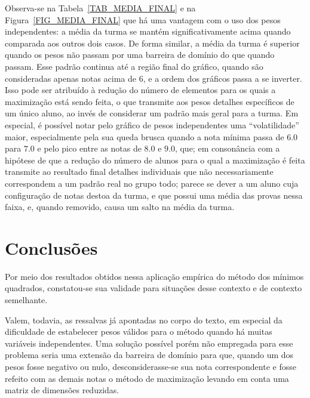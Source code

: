 \documentclass[11pt]{article}
\begin{document}
                Observa-se na
                Tabela~\ref{TAB_MEDIA_FINAL} e na
                Figura~\ref{FIG_MEDIA_FINAL} que há uma
                vantagem com o uso dos pesos independentes:
                a média da turma se mantém significativamente
                acima quando comparada aos outros dois casos.
                De forma similar, a média da turma é
                superior
                quando os pesos não passam por uma
                barreira de domínio do que quando passam.
                Esse padrão continua até a região final do
                gráfico, quando são consideradas apenas
                notas acima de $6$, e a ordem dos gráficos
                passa a se inverter. Isso pode ser atribuído
                à redução do número de elementos para os
                quais a maximização está sendo feita, o que
                transmite aos pesos detalhes específicos
                de um único aluno, ao invés de considerar
                um padrão mais geral para a turma.
                Em especial, é possível notar pelo gráfico
                de pesos independentes uma ``volatilidade''
                maior, especialmente pela sua queda brusca
                quando a nota mínima passa de $6.0$ para
                $7.0$ e pelo pico entre as notas de
                $8.0$ e $9.0$, que; em consonância com a
                hipótese de que a redução do número de
                alunos para o qual a maximização é feita
                transmite ao resultado final detalhes
                individuais que não necessariamente correspondem
                a um padrão real no grupo todo; parece se
                dever a um aluno cuja configuração de
                notas destoa da turma, e que possui uma
                média das provas nessa faixa, e, quando
                removido, causa um salto na média da turma.

        \section{Conclusões}
                Por meio dos resultados obtidos nessa
                aplicação empírica do método dos mínimos
                quadrados, constatou-se sua validade para
                situações desse contexto e de contexto
                semelhante.

                Valem, todavia, as ressalvas já apontadas no
                corpo do texto, em especial da dificuldade de
                estabelecer pesos válidos para o método quando
                há muitas variáveis independentes. Uma
                solução possível porém não empregada para esse
                problema seria uma extensão da barreira
                de domínio para que, quando um dos pesos
                fosse negativo ou nulo, desconsiderasse-se
                sua nota correspondente e fosse refeito com as
                demais notas o método de maximização levando
                em conta uma matriz de dimensões reduzidas.
\end{document}
